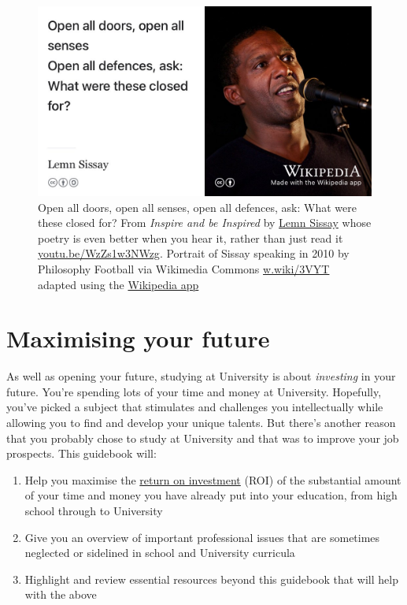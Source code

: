 \documentclass[
]{book}
\providecommand{\tightlist}{%
  \setlength{\itemsep}{0pt}\setlength{\parskip}{0pt}}
\begin{document}
\begin{figure}

{\centering \includegraphics[width=0.99\linewidth]{images/lemninspire} 

}

\caption{Open all doors, open all senses, open all defences, ask: What were these closed for? From \emph{Inspire and be Inspired} by \href{https://en.wikipedia.org/wiki/Lemn_Sissay}{Lemn Sissay} whose poetry is even better when you hear it, rather than just read it \href{https://youtu.be/WzZs1w3NWzg}{youtu.be/WzZs1w3NWzg}. \citep{sissay} Portrait of Sissay speaking in 2010 by Philosophy Football via Wikimedia Commons \href{https://w.wiki/3VYT}{w.wiki/3VYT} adapted using the \href{https://apps.apple.com/gb/app/wikipedia/id324715238}{Wikipedia app}}\label{fig:lemn-fig}
\end{figure}



\hypertarget{roi}{%
\section{Maximising your future}\label{roi}}

As well as opening your future, studying at University is about \emph{investing} in your future. You're spending lots of your time and money at University. Hopefully, you've picked a subject that stimulates and challenges you intellectually while allowing you to find and develop your unique talents. But there's another reason that you probably chose to study at University and that was to improve your job prospects. This guidebook will:

\begin{enumerate}
\def\labelenumi{\arabic{enumi}.}
\tightlist
\item
  Help you maximise the \href{https://en.wikipedia.org/wiki/Return_on_investment}{return on investment} (ROI) of the substantial amount of your time and money you have already put into your education, from high school through to University
\item
  Give you an overview of important professional issues that are sometimes neglected or sidelined in school and University curricula
\item
  Highlight and review essential resources beyond this guidebook that will help with the above
\end{enumerate}
\end{document}
